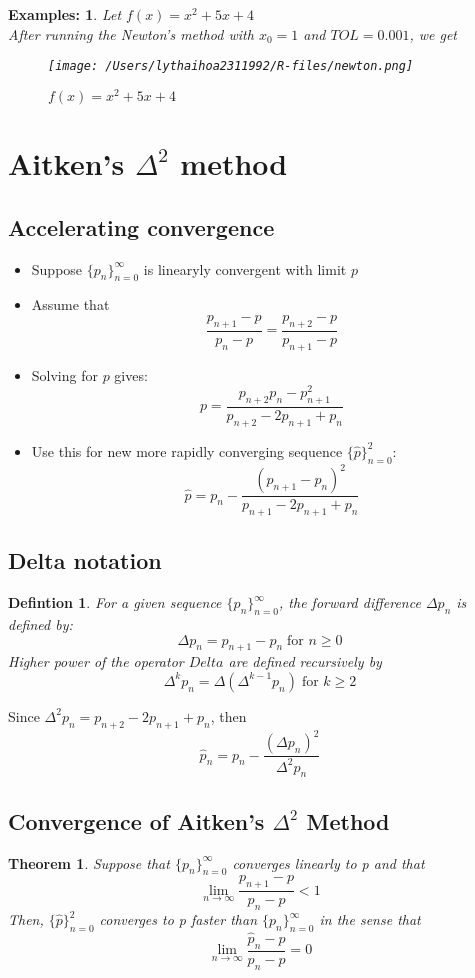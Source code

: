 \documentclass[12pt]{article}
\newtheorem{theorem}{Theorem}[subsection]
\newtheorem*{ex}{Examples:}
\newtheorem*{definition}{Defintion}
\begin{document}
\begin{ex}
Let $f(x) = x^2 + 5x +4$ \\
After running the Newton's method with $x_0 = 1$ and $TOL = 0.001$, we get 	\\
\begin{figure}[H]
\centering 
\texttt{[image: /Users/lythaihoa2311992/R-files/newton.png]}
\caption{$f(x) = x^2 +5x +4$}	
\end{figure}	
\end{ex}



\section{Aitken's $\Delta^2$ method}
\subsection{Accelerating convergence}
\begin{itemize}
	\item Suppose $\{p_n\}_{n=0}^{\infty}$ is linearyly convergent with limit $p$
	\item Assume that $$\frac{p_{n+1}-p}{p_n -p} = \frac{p_{n+2}-p}{p_{n+1} -p}$$
	\item Solving for $p$ gives: $$p = \frac{p_{n+2}p_n-p_{n+1}^2}{p_{n+2} -2p_{n+1}+p_n}$$
	\item Use this for new more rapidly converging sequence $\{\hat{p}\}_{n=0}^2$: $$\hat{p} = p_n -\frac{(p_{n+1} -p_n)^2}{p_{n+1} -2p_{n+1} +p_n}$$
\end{itemize}

\subsection{Delta notation}
\begin{definition}
	For a given sequence $\{p_n\}_{n=0}^{\infty}$, the forward difference $\Delta p_n$ is defined by:
	$$\Delta p_n = p_{n+1} - p_n \; \text{for $n \geq 0$}$$
	Higher power of the operator $Delta$ are defined recursively by $$\Delta^kp_n = \Delta(\Delta^{k-1}p_n) \; \text{for $k \geq 2$}$$
	\end{definition}
Since $\Delta^2p_n = p_{n+2} -2p_{n+1} + p_n$, then $$\hat{p}_n = p_n - \frac{(\Delta p_n)^2}{\Delta^2 p_n}$$
\subsection{Convergence of Aitken's $\Delta^2$ Method}
\begin{theorem}
Suppose that $\{p_n\}_{n=0}^{\infty}$ converges linearly to p and that $$\lim_{n \to \infty} \frac{p_{n+1} - p}{p_n - p} <1$$
Then,  	$\{\hat{p}\}_{n=0}^2$ converges to p faster than $\{p_n\}_{n=0}^{\infty}$ in the sense that 
$$\lim_{n \to \infty}\frac{\hat{p}_n -p}{p_n - p} = 0$$
\end{theorem}
\end{document}

